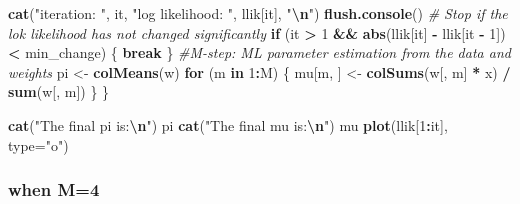 \documentclass[
]{article}
\newenvironment{Shaded}{\begin{snugshade}}{\end{snugshade}}
\newcommand{\AttributeTok}[1]{\textcolor[rgb]{0.13,0.29,0.53}{#1}}
\newcommand{\CommentTok}[1]{\textcolor[rgb]{0.56,0.35,0.01}{\textit{#1}}}
\newcommand{\ControlFlowTok}[1]{\textcolor[rgb]{0.13,0.29,0.53}{\textbf{#1}}}
\newcommand{\DecValTok}[1]{\textcolor[rgb]{0.00,0.00,0.81}{#1}}
\newcommand{\FunctionTok}[1]{\textcolor[rgb]{0.13,0.29,0.53}{\textbf{#1}}}
\newcommand{\NormalTok}[1]{#1}
\newcommand{\OtherTok}[1]{\textcolor[rgb]{0.56,0.35,0.01}{#1}}
\newcommand{\SpecialCharTok}[1]{\textcolor[rgb]{0.81,0.36,0.00}{\textbf{#1}}}
\newcommand{\StringTok}[1]{\textcolor[rgb]{0.31,0.60,0.02}{#1}}
\begin{document}
\begin{Shaded}
\begin{Highlighting}[]
  \FunctionTok{cat}\NormalTok{(}\StringTok{"iteration: "}\NormalTok{, it, }\StringTok{"log likelihood: "}\NormalTok{, llik[it], }\StringTok{"}\SpecialCharTok{\textbackslash{}n}\StringTok{"}\NormalTok{)}
  \FunctionTok{flush.console}\NormalTok{()}
  \CommentTok{\# Stop if the lok likelihood has not changed significantly}
  \ControlFlowTok{if}\NormalTok{ (it }\SpecialCharTok{\textgreater{}} \DecValTok{1} \SpecialCharTok{\&\&} \FunctionTok{abs}\NormalTok{(llik[it] }\SpecialCharTok{{-}}\NormalTok{ llik[it }\SpecialCharTok{{-}} \DecValTok{1}\NormalTok{]) }\SpecialCharTok{\textless{}}\NormalTok{ min\_change) \{}
    \ControlFlowTok{break}
\NormalTok{  \}}
  \CommentTok{\#M{-}step: ML parameter estimation from the data and weights}
\NormalTok{  pi }\OtherTok{\textless{}{-}} \FunctionTok{colMeans}\NormalTok{(w)}
  \ControlFlowTok{for}\NormalTok{ (m }\ControlFlowTok{in} \DecValTok{1}\SpecialCharTok{:}\NormalTok{M) \{}
\NormalTok{    mu[m, ] }\OtherTok{\textless{}{-}} \FunctionTok{colSums}\NormalTok{(w[, m] }\SpecialCharTok{*}\NormalTok{ x) }\SpecialCharTok{/} \FunctionTok{sum}\NormalTok{(w[, m])}
\NormalTok{  \}}
\NormalTok{\}}

\FunctionTok{cat}\NormalTok{(}\StringTok{"The final pi is:}\SpecialCharTok{\textbackslash{}n}\StringTok{"}\NormalTok{)}
\NormalTok{pi}
\FunctionTok{cat}\NormalTok{(}\StringTok{"The final mu is:}\SpecialCharTok{\textbackslash{}n}\StringTok{"}\NormalTok{)}
\NormalTok{mu}
\FunctionTok{plot}\NormalTok{(llik[}\DecValTok{1}\SpecialCharTok{:}\NormalTok{it], }\AttributeTok{type=}\StringTok{"o"}\NormalTok{)}
\end{Highlighting}
\end{Shaded}

\hypertarget{when-m4-1}{%
\subsubsection{when M=4}\label{when-m4-1}}
\end{document}
